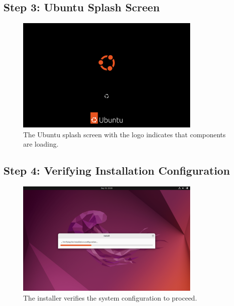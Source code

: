 \documentclass{article}
\begin{document}
\subsection{Step 3: Ubuntu Splash Screen}
\begin{figure}[H]
    \centering
    \includegraphics[width=0.8\textwidth]{2024-09-17_04-25-06.png}
    \caption{The Ubuntu splash screen with the logo indicates that components are loading.}
\end{figure}

\subsection{Step 4: Verifying Installation Configuration}
\begin{figure}[H]
    \centering
    \includegraphics[width=0.8\textwidth]{2024-09-17_04-26-58.png}
    \caption{The installer verifies the system configuration to proceed.}
\end{figure}
\end{document}
